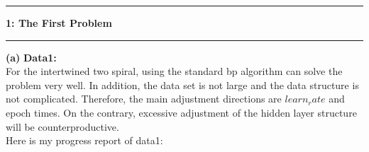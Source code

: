\documentclass[11pt]{article}
\newcommand\question[2]{\vspace{.25in}\hrule\textbf{#1: #2}\vspace{.5em}\hrule\vspace{.10in}}
\renewcommand\part[1]{\vspace{.10in}\textbf{(#1)}}
\newcommand\one{\vspace{.10in}\textbf{Data1: }}
\begin{document}
\raggedright
\newcommand\NAME{Yao Xiao}  %
\newcommand\ANDREWID{2019180015}     %
\newcommand\HWNUM{1}              %


\question{1}{The First Problem} 

\part{a} \one\\
For the intertwined two spiral, using the standard bp algorithm can solve the problem very well.
In addition, the data set is not large and the data structure is not complicated. Therefore, the main adjustment directions are $learn_rate$ and epoch times. On the contrary, excessive adjustment of the hidden layer structure will be counterproductive.\\
Here is my progress report of data1:\\
\end{document}

